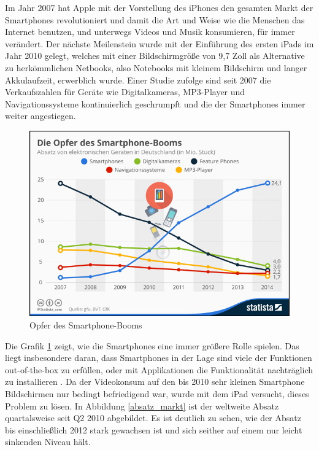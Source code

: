 \documentclass[11pt,a4paper]{report}
\begin{document}
Im Jahr 2007 hat Apple mit der Vorstellung des iPhones den gesamten Markt der Smartphones revolutioniert und damit die Art und Weise wie die Menschen das Internet benutzen, und unterwegs Videos und Musik konsumieren, für immer verändert. Der nächste Meilenstein wurde mit der Einführung des ersten iPads im Jahr 2010 gelegt, welches mit einer Bildschirmgröße von 9,7 Zoll als Alternative zu herkömmlichen Netbooks, also Notebooks mit kleinem Bildschirm und langer Akkulaufzeit, erwerblich wurde. Einer Studie \cite{SmartphoneBooms} zufolge sind seit 2007 die Verkaufszahlen für Geräte wie Digitalkameras, MP3-Player und Navigationssysteme kontinuierlich geschrumpft und die der Smartphones immer weiter angestiegen.
\begin{figure}[h]
\begin{center}
\includegraphics[scale=1.2]{./images/1.png}
\caption{Opfer des Smartphone-Booms \cite{SmartphoneBooms}}
\label{boom_opfer}
\end{center}
\end{figure}
Die Grafik \ref{boom_opfer} zeigt, wie die Smartphones eine immer größere Rolle spielen. Das liegt insbesondere daran, dass Smartphones in der Lage sind viele der Funktionen out-of-the-box zu erfüllen, oder mit Applikationen die Funktionalität nachträglich zu installieren \cite{zhou2011taming}. Da der Videokonsum auf den bis 2010 sehr kleinen Smartphone Bildschirmen nur bedingt befriedigend war, wurde mit dem iPad versucht, dieses Problem zu lösen. In Abbildung \ref{absatz_markt} ist der weltweite Absatz quartalsweise seit Q2 2010 abgebildet. Es ist deutlich zu sehen, wie der Absatz bis einschließlich 2012 stark gewachsen ist und sich seither auf einem nur leicht sinkenden Niveau hält.
\end{document}
